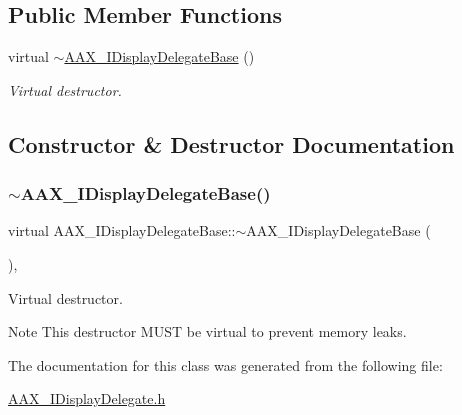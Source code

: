 \subsection*{Public Member Functions}
\begin{DoxyCompactItemize}
\item 
virtual \mbox{\hyperlink{a01797_a0fdaa922b4356fb4a246053bb441a840}{$\sim$\+A\+A\+X\+\_\+\+I\+Display\+Delegate\+Base}} ()
\begin{DoxyCompactList}\small\item\em Virtual destructor. \end{DoxyCompactList}\end{DoxyCompactItemize}


\subsection{Constructor \& Destructor Documentation}
\mbox{\label{a01797_a0fdaa922b4356fb4a246053bb441a840}} 
\subsubsection{\texorpdfstring{$\sim$AAX\_IDisplayDelegateBase()}{~AAX\_IDisplayDelegateBase()}}
{\footnotesize\ttfamily virtual A\+A\+X\+\_\+\+I\+Display\+Delegate\+Base\+::$\sim$\+A\+A\+X\+\_\+\+I\+Display\+Delegate\+Base (\begin{DoxyParamCaption}{ }\end{DoxyParamCaption})\hspace{0.3cm}{\ttfamily [inline]}, {\ttfamily [virtual]}}



Virtual destructor. 

\begin{DoxyNote}{Note}
This destructor M\+U\+ST be virtual to prevent memory leaks. 
\end{DoxyNote}


The documentation for this class was generated from the following file\+:\begin{DoxyCompactItemize}
\item 
\mbox{\hyperlink{a00581}{A\+A\+X\+\_\+\+I\+Display\+Delegate.\+h}}\end{DoxyCompactItemize}

